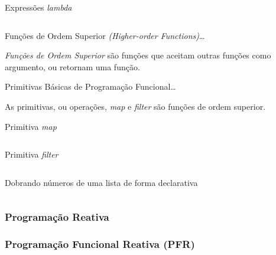 \begin{listing}[H]
  \centering
  \caption{Expressões \emph{lambda}}
  \inputminted{js}{code/fp_lambdas.js}
  \label{code:fp_lambdas}
\end{listing}

Funções de Ordem Superior \emph{(Higher-order Functions)}…


\emph{Funções de Ordem Superior} são funções que aceitam outras funções como
argumento, ou retornam uma função.


Primitivas Básicas de Programação Funcional…


As primitivas, ou operações, \emph{map} e \emph{filter} são funções de ordem superior.

\begin{listing}[H]
  \centering
  \caption{Primitiva \emph{map}}
  \inputminted{js}{code/fp_primitives_map.js}
  \label{code:fp_primitives_map}
\end{listing}

\begin{listing}[H]
  \centering
  \caption{Primitiva \emph{filter}}
  \inputminted{js}{code/fp_primitives_filter.js}
  \label{code:fp_primitives_filter}
\end{listing}


\begin{listing}[H]
  \centering
  \caption{Dobrando números de uma lista de forma declarativa}
  \inputminted{js}{code/fn_double_numbers_declarative.js}
  \label{code:fn_double_numbers_declarative}
\end{listing}


\subsubsection{Programação Reativa}
\label{sec:rp}



\subsubsection{Programação Funcional Reativa (PFR)}
\label{sec:frp}



